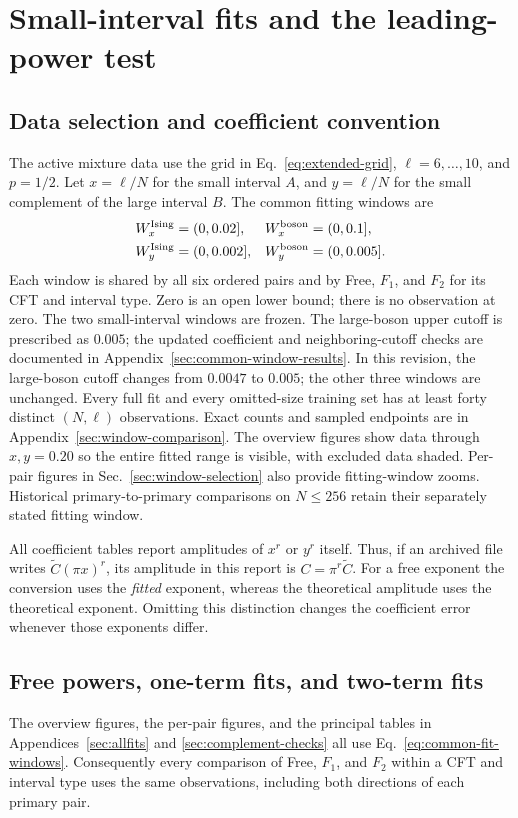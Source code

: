 \clearpage
\section{Small-interval fits and the leading-power test}
\label{sec:fits}
\subsection{Data selection and coefficient convention}
\label{sec:fit-selection}
The active mixture data use the grid in Eq.~\eqref{eq:extended-grid},
$\ell=6,\ldots,10$, and $p=1/2$. Let $x=\ell/N$ for the small
interval $A$, and $y=\ell/N$ for the small complement of the large
interval $B$. The common fitting windows are
\begin{align}
 W_x^{\rm Ising}&=(0,0.02],& W_x^{\rm boson}&=(0,0.1],\nonumber\\
 W_y^{\rm Ising}&=(0,0.002],& W_y^{\rm boson}&=(0,0.005].
 \label{eq:common-fit-windows}
\end{align}
Each window is shared by all six ordered pairs and by Free, $F_1$,
and $F_2$ for its CFT and interval type. Zero is an open lower bound;
there is no observation at zero. The two small-interval windows are
frozen. The large-boson upper cutoff is prescribed as $0.005$; the updated
coefficient and neighboring-cutoff checks are documented in
Appendix~\ref{sec:common-window-results}. In this revision,
the large-boson cutoff changes from $0.0047$ to $0.005$; the other
three windows are unchanged.
Every full fit and every omitted-size training set has at least forty
distinct $(N,\ell)$ observations. Exact counts and sampled endpoints
are in Appendix~\ref{sec:window-comparison}.
The overview figures show data through $x,y=0.20$ so the entire fitted
range is visible, with excluded data shaded. Per-pair figures in
Sec.~\ref{sec:window-selection} also provide fitting-window zooms.
Historical primary-to-primary comparisons on $N\leq256$ retain their
separately stated fitting window.

All coefficient tables report amplitudes of $x^r$ or $y^r$ itself.
Thus, if an archived file writes $\widetilde C(\pi x)^r$, its amplitude
in this report is $C=\pi^r\widetilde C$. For a free exponent the
conversion uses the \emph{fitted} exponent, whereas the theoretical
amplitude uses the theoretical exponent. Omitting this distinction
changes the coefficient error whenever those exponents differ.

\subsection{Free powers, one-term fits, and two-term fits}
The overview figures, the per-pair figures, and the principal tables
in Appendices~\ref{sec:allfits} and \ref{sec:complement-checks} all
use Eq.~\eqref{eq:common-fit-windows}. Consequently every comparison
of Free, $F_1$, and $F_2$ within a CFT and interval type uses the same
observations, including both directions of each primary pair.

